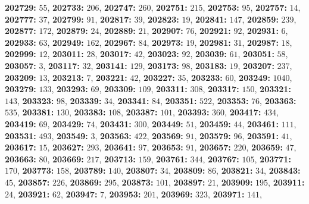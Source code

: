 \textsf{\bfseries 202729:} $55$, \textsf{\bfseries 202733:} $206$, \textsf{\bfseries 202747:} $260$, \textsf{\bfseries 202751:} $215$, \textsf{\bfseries 202753:} $95$, \textsf{\bfseries 202757:} $14$, \textsf{\bfseries 202777:} $37$, \textsf{\bfseries 202799:} $91$, \textsf{\bfseries 202817:} $39$, \textsf{\bfseries 202823:} $19$, \textsf{\bfseries 202841:} $147$, \textsf{\bfseries 202859:} $239$, \textsf{\bfseries 202877:} $172$, \textsf{\bfseries 202879:} $24$, \textsf{\bfseries 202889:} $21$, \textsf{\bfseries 202907:} $76$, \textsf{\bfseries 202921:} $92$, \textsf{\bfseries 202931:} $6$, \textsf{\bfseries 202933:} $63$, \textsf{\bfseries 202949:} $162$, \textsf{\bfseries 202967:} $84$, \textsf{\bfseries 202973:} $19$, \textsf{\bfseries 202981:} $31$, \textsf{\bfseries 202987:} $18$, \textsf{\bfseries 202999:} $12$, \textsf{\bfseries 203011:} $28$, \textsf{\bfseries 203017:} $42$, \textsf{\bfseries 203023:} $92$, \textsf{\bfseries 203039:} $61$, \textsf{\bfseries 203051:} $58$, \textsf{\bfseries 203057:} $3$, \textsf{\bfseries 203117:} $32$, \textsf{\bfseries 203141:} $129$, \textsf{\bfseries 203173:} $98$, \textsf{\bfseries 203183:} $19$, \textsf{\bfseries 203207:} $237$, \textsf{\bfseries 203209:} $13$, \textsf{\bfseries 203213:} $7$, \textsf{\bfseries 203221:} $42$, \textsf{\bfseries 203227:} $35$, \textsf{\bfseries 203233:} $60$, \textsf{\bfseries 203249:} $1040$, \textsf{\bfseries 203279:} $133$, \textsf{\bfseries 203293:} $69$, \textsf{\bfseries 203309:} $109$, \textsf{\bfseries 203311:} $308$, \textsf{\bfseries 203317:} $150$, \textsf{\bfseries 203321:} $143$, \textsf{\bfseries 203323:} $98$, \textsf{\bfseries 203339:} $34$, \textsf{\bfseries 203341:} $84$, \textsf{\bfseries 203351:} $522$, \textsf{\bfseries 203353:} $76$, \textsf{\bfseries 203363:} $535$, \textsf{\bfseries 203381:} $130$, \textsf{\bfseries 203383:} $108$, \textsf{\bfseries 203387:} $101$, \textsf{\bfseries 203393:} $360$, \textsf{\bfseries 203417:} $434$, \textsf{\bfseries 203419:} $69$, \textsf{\bfseries 203429:} $74$, \textsf{\bfseries 203431:} $300$, \textsf{\bfseries 203449:} $51$, \textsf{\bfseries 203459:} $44$, \textsf{\bfseries 203461:} $111$, \textsf{\bfseries 203531:} $493$, \textsf{\bfseries 203549:} $3$, \textsf{\bfseries 203563:} $422$, \textsf{\bfseries 203569:} $91$, \textsf{\bfseries 203579:} $96$, \textsf{\bfseries 203591:} $41$, \textsf{\bfseries 203617:} $15$, \textsf{\bfseries 203627:} $293$, \textsf{\bfseries 203641:} $97$, \textsf{\bfseries 203653:} $91$, \textsf{\bfseries 203657:} $220$, \textsf{\bfseries 203659:} $47$, \textsf{\bfseries 203663:} $80$, \textsf{\bfseries 203669:} $217$, \textsf{\bfseries 203713:} $159$, \textsf{\bfseries 203761:} $344$, \textsf{\bfseries 203767:} $105$, \textsf{\bfseries 203771:} $170$, \textsf{\bfseries 203773:} $158$, \textsf{\bfseries 203789:} $140$, \textsf{\bfseries 203807:} $34$, \textsf{\bfseries 203809:} $86$, \textsf{\bfseries 203821:} $34$, \textsf{\bfseries 203843:} $45$, \textsf{\bfseries 203857:} $226$, \textsf{\bfseries 203869:} $295$, \textsf{\bfseries 203873:} $101$, \textsf{\bfseries 203897:} $21$, \textsf{\bfseries 203909:} $195$, \textsf{\bfseries 203911:} $24$, \textsf{\bfseries 203921:} $62$, \textsf{\bfseries 203947:} $7$, \textsf{\bfseries 203953:} $201$, \textsf{\bfseries 203969:} $323$, \textsf{\bfseries 203971:} $141$, 
